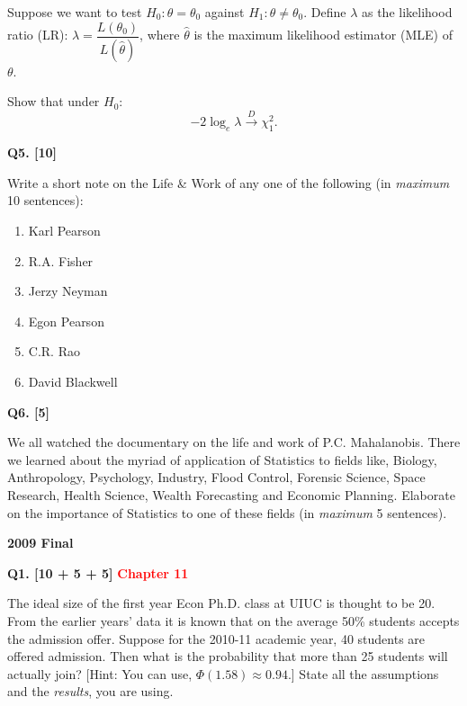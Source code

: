 \documentclass[11pt]{article}
\begin{document}
Suppose we want to test $H_0:\theta=\theta_0$ against $H_1:\theta\neq\theta_0$. Define $\lambda$ as the likelihood ratio (LR): $\lambda=\dfrac{L(\theta_0)}{L(\hat\theta)}$, where $\hat\theta$ is the maximum likelihood estimator (MLE) of $\theta$.

Show that under $H_0$:
\[
-2\log_e\lambda\xrightarrow{D}\chi_1^2.
\]

\bigskip

\textbf{Q5. [10]}

Write a short note on the Life \& Work of any one of the following (in \emph{maximum} 10 sentences):

\begin{enumerate}
\item[(i)] Karl Pearson
\item[(ii)] R.A. Fisher
\item[(iii)] Jerzy Neyman
\item[(iv)] Egon Pearson
\item[(v)] C.R. Rao
\item[(vi)] David Blackwell
\end{enumerate}

\bigskip

\textbf{Q6. [5]}

We all watched the documentary on the life and work of P.C. Mahalanobis. There we learned about the myriad of application of Statistics to fields like, Biology, Anthropology, Psychology, Industry, Flood Control, Forensic Science, Space Research, Health Science, Wealth Forecasting and Economic Planning. Elaborate on the importance of Statistics to one of these fields (in \emph{maximum} 5 sentences).



\clearpage

\begin{center}
    {\Large\bfseries 2009 Final}
\end{center}

\vspace{1em}

\textbf{Q1. [10 + 5 + 5]} \textbf{\textcolor{red}{Chapter 11}}

The ideal size of the first year Econ Ph.D. class at UIUC is thought to be 20. From the earlier years' data it is known that on the average 50\% students accepts the admission offer. Suppose for the 2010-11 academic year, 40 students are offered admission. Then what is the probability that more than 25 students will actually join? [Hint: You can use, $\Phi(1.58)\approx 0.94$.] State all the assumptions and the \emph{results}, you are using.
\end{document}
